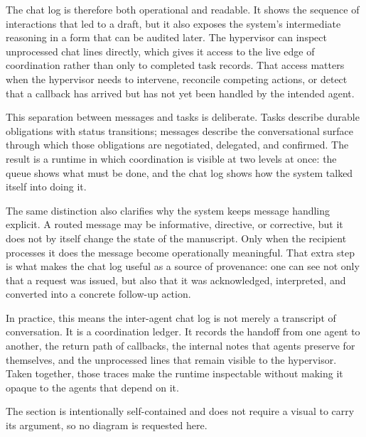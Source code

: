 The chat log is therefore both operational and readable. It shows the sequence of interactions that led to a draft, but it also exposes the system's intermediate reasoning in a form that can be audited later. The hypervisor can inspect unprocessed chat lines directly, which gives it access to the live edge of coordination rather than only to completed task records. That access matters when the hypervisor needs to intervene, reconcile competing actions, or detect that a callback has arrived but has not yet been handled by the intended agent.

This separation between messages and tasks is deliberate. Tasks describe durable obligations with status transitions; messages describe the conversational surface through which those obligations are negotiated, delegated, and confirmed. The result is a runtime in which coordination is visible at two levels at once: the queue shows what must be done, and the chat log shows how the system talked itself into doing it.

The same distinction also clarifies why the system keeps message handling explicit. A routed message may be informative, directive, or corrective, but it does not by itself change the state of the manuscript. Only when the recipient processes it does the message become operationally meaningful. That extra step is what makes the chat log useful as a source of provenance: one can see not only that a request was issued, but also that it was acknowledged, interpreted, and converted into a concrete follow-up action.

In practice, this means the inter-agent chat log is not merely a transcript of conversation. It is a coordination ledger. It records the handoff from one agent to another, the return path of callbacks, the internal notes that agents preserve for themselves, and the unprocessed lines that remain visible to the hypervisor. Taken together, those traces make the runtime inspectable without making it opaque to the agents that depend on it.

The section is intentionally self-contained and does not require a visual to carry its argument, so no diagram is requested here.
